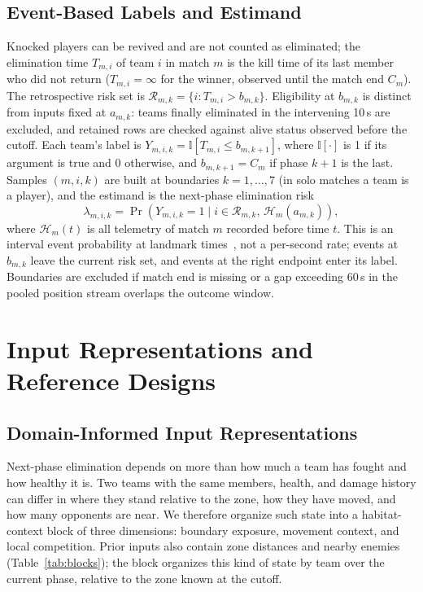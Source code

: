 \documentclass[sigconf,anonymous,nonacm]{acmart}
\begin{document}
\subsection{Event-Based Labels and Estimand}
\label{sec:method:labels}
Knocked players can be revived and are not counted as eliminated; the elimination time $T_{m,i}$ of team $i$ in match $m$ is the kill time of its last member who did not return ($T_{m,i}=\infty$ for the winner, observed until the match end $C_m$).
The retrospective risk set is $\mathcal{R}_{m,k}=\{i:T_{m,i}>b_{m,k}\}$. Eligibility at $b_{m,k}$ is distinct from inputs fixed at $a_{m,k}$: teams finally eliminated in the intervening 10\,s are excluded, and retained rows are checked against alive status observed before the cutoff.
Each team's label is $Y_{m,i,k}=\mathbb{I}[T_{m,i}\le b_{m,k+1}]$, where $\mathbb{I}[\cdot]$ is 1 if its argument is true and 0 otherwise, and $b_{m,k+1}=C_m$ if phase $k+1$ is the last.
Samples $(m,i,k)$ are built at boundaries $k=1,\dots,7$ (in solo matches a team is a player), and the estimand is the next-phase elimination risk
\begin{equation}
\lambda_{m,i,k}=\Pr\!\left(Y_{m,i,k}=1 \mid i\in\mathcal{R}_{m,k},\,\mathcal{H}_{m}(a_{m,k})\right),
\label{eq:hazard}
\end{equation}
where $\mathcal{H}_{m}(t)$ is all telemetry of match $m$ recorded before time $t$.
This is an interval event probability at landmark times~\cite{vanHouwelingen07}, not a per-second rate; events at $b_{m,k}$ leave the current risk set, and events at the right endpoint enter its label. Boundaries are excluded if match end is missing or a gap exceeding 60\,s in the pooled position stream overlaps the outcome window.

\section{Input Representations and Reference Designs}
\label{sec:method:design}
\subsection{Domain-Informed Input Representations}
\label{sec:method:representation}
Next-phase elimination depends on more than how much a team has fought and how healthy it is. Two teams with the same members, health, and damage history can differ in where they stand relative to the zone, how they have moved, and how many opponents are near. We therefore organize such state into a habitat-context block of three dimensions: boundary exposure, movement context, and local competition. Prior inputs also contain zone distances and nearby enemies (Table~\ref{tab:blocks}); the block organizes this kind of state by team over the current phase, relative to the zone known at the cutoff.
\end{document}
